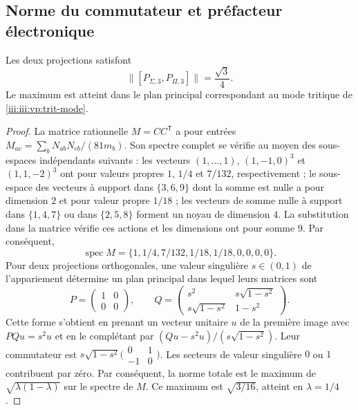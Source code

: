 \subsection{Norme du commutateur et préfacteur électronique}

\begin{theorem}
Les deux projections satisfont
\begin{equation}
 \bigl\|[P_{\Sigma,3},P_{\Pi,3}]\bigr\|=\frac{\sqrt3}{4}.
 \label{iii:iii:vp:prefactor}
\end{equation}
Le maximum est atteint dans le plan principal correspondant au mode
tritique de \eqref{iii:iii:vp:trit-mode}.
\end{theorem}
\begin{proof}
La matrice rationnelle $M=CC^{\mathsf T}$ a pour entrées $M_{ac}=\sum_bN_{ab}N_{cb}/(81m_b)$. Son spectre complet se vérifie au moyen des sous-espaces indépendants suivants : les vecteurs $(1,\ldots,1)$, $(1,-1,0)^3$ et $(1,1,-2)^3$ ont pour valeurs propres $1$, $1/4$ et $7/132$, respectivement ; le sous-espace des vecteurs à support dans $\{3,6,9\}$ dont la somme est nulle a pour dimension $2$ et pour valeur propre $1/18$ ; les vecteurs de somme nulle à support dans $\{1,4,7\}$ ou dans $\{2,5,8\}$ forment un noyau de dimension $4$. La substitution dans la matrice vérifie ces actions et les dimensions ont pour somme $9$. Par conséquent,
\[
 \operatorname{spec}M=
 \{1,1/4,7/132,1/18,1/18,0,0,0,0\}.
\]
Pour deux projections orthogonales, une valeur singulière $s\in(0,1)$ de
l’appariement détermine un plan principal dans lequel leurs matrices sont
\[
 P=\begin{pmatrix}1&0\\0&0\end{pmatrix},\qquad
 Q=\begin{pmatrix}s^2&s\sqrt{1-s^2}\\
 s\sqrt{1-s^2}&1-s^2\end{pmatrix}.
\]
Cette forme s’obtient en prenant un vecteur unitaire $u$ de la première
image avec $PQu=s^2u$ et en le complétant par
$(Qu-s^2u)/(s\sqrt{1-s^2})$. Leur commutateur est
$s\sqrt{1-s^2}\bigl(\begin{smallmatrix}0&1\\-1&0\end{smallmatrix}\bigr)$.
Les secteurs de valeur singulière $0$ ou $1$ contribuent par zéro.
Par conséquent, la norme totale est le maximum de
$\sqrt{\lambda(1-\lambda)}$ sur le spectre de $M$. Ce maximum
est $\sqrt{3/16}$, atteint en $\lambda=1/4$.
\end{proof}

